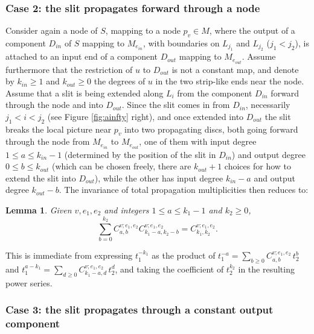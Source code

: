 \documentclass[11pt,leqno]{amsart}
\newtheorem{lemma}[theo]{Lemma}
\numberwithin{equation}{section}
\begin{document}
\subsubsection*{Case 2: the slit propagates forward through a node}
Consider again a node of $S$, mapping to a node $p_v\in M$, where the output 
of a component $D_{in}$ of $S$ mapping to $M_{e_{in}}$, with
boundaries on $L_{j_1}$ and $L_{j_2}$ ($j_1<j_2$), is attached to an
input end of a component $D_{out}$ mapping to $M_{e_{out}}$. Assume furthermore
that the restriction of $u$ to $D_{out}$ is not a constant map, and denote by $k_{in}\geq 1$ and
$k_{out}\geq 0$ the degrees of $u$ in the two strip-like ends near the node.
Assume that a slit is being extended along $L_i$ from the component $D_{in}$
forward through the node and into $D_{out}$. Since the slit comes in from
$D_{in}$, necessarily $j_1<i<j_2$ (see Figure \ref{fig:ainfty} right), and
once extended into $D_{out}$ the slit breaks the local picture 
near $p_v$ into two propagating discs, both going forward through the node
from $M_{e_{in}}$ to $M_{e_{out}}$, one of them with input degree $1\leq
a\leq k_{in}-1$ (determined by the position of the slit in $D_{in}$) and
output degree $0\leq b\leq k_{out}$ (which can be chosen freely, there are
$k_{out}+1$ choices for how to extend the slit into $D_{out}$), while the
other has input degree $k_{in}-a$ and output degree $k_{out}-b$. The
invariance of total propagation multiplicities then reduces to:

\begin{lemma} Given $v,e_1,e_2$ and integers $1\leq a\leq k_1-1$ and
$k_2\geq 0$, \begin{equation}\label{eq:ainfty_combi_forward}
\sum_{b=0}^{k_2} C_{a,b}^{v;e_1,e_2} C_{k_1-a,k_2-b}^{v;e_1,e_2}=C_{k_1,k_2}^{v;e_1,e_2}.  
\end{equation}
\end{lemma}

\proof This is immediate from expressing $t_1^{-k_1}$ as the product of
$t_1^{-a}=\sum_{b\geq 0} C_{a,b}^{v;e_1,e_2}\, t_2^b$ and
$t_1^{a-k_1}=\sum_{d\geq 0} C_{k_1-a,d}^{v;e_1,e_2}\, t_2^d$, and taking the
coefficient of $t_2^{k_2}$ in the resulting power series.\endproof

\subsubsection*{Case 3: the slit propagates through a constant output component}
\end{document}
